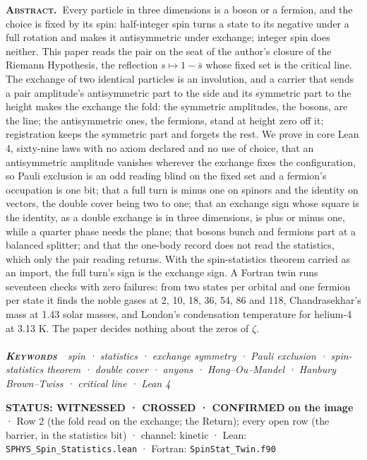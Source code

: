 \documentclass[10pt]{article}
\renewenvironment{quote}{\par\smallskip\noindent\small\color{deep}}{\par\smallskip}
\begin{document}
{\small\noindent\textbf{\scshape\color{deep}Abstract.\ }Every particle
in three dimensions is a boson or a fermion, and the choice is fixed by
its spin: half-integer spin turns a state to its negative under a full
rotation and makes it antisymmetric under exchange; integer spin does
neither. This paper reads the pair on the seat of the author's closure
of the Riemann Hypothesis, the reflection \(s\mapsto1-\bar s\) whose
fixed set is the critical line. The exchange of two identical particles
is an involution, and a carrier that sends a pair amplitude's
antisymmetric part to the side and its symmetric part to the height
makes the exchange the fold: the symmetric amplitudes, the bosons, are
the line; the antisymmetric ones, the fermions, stand at height zero off
it; registration keeps the symmetric part and forgets the rest. We prove
in core Lean 4, sixty-nine laws with no axiom declared and no use of
choice, that an antisymmetric amplitude vanishes wherever the exchange
fixes the configuration, so Pauli exclusion is an odd reading blind on
the fixed set and a fermion's occupation is one bit; that a full turn is
minus one on spinors and the identity on vectors, the double cover being
two to one; that an exchange sign whose square is the identity, as a
double exchange is in three dimensions, is plus or minus one, while a
quarter phase needs the plane; that bosons bunch and fermions part at a
balanced splitter; and that the one-body record does not read the
statistics, which only the pair reading returns. With the
spin-statistics theorem carried as an import, the full turn's sign is
the exchange sign. A Fortran twin runs seventeen checks with zero
failures: from two states per orbital and one fermion per state it finds
the noble gases at 2, 10, 18, 36, 54, 86 and 118, Chandrasekhar's mass
at 1.43 solar masses, and London's condensation temperature for helium-4
at 3.13 K. The paper decides nothing about the zeros of
\(\zeta\).}\\[-2pt]
\noindent{\color{accent}\rule{\textwidth}{0.6pt}}\\[1pt]
{\itshape\footnotesize\color{faint}\noindent\textbf{\upshape\scshape\color{deep}Keywords\ }\ spin
· statistics · exchange symmetry · Pauli exclusion · spin-statistics
theorem · double cover · anyons · Hong--Ou--Mandel · Hanbury
Brown--Twiss · critical line · Lean 4}\par\vspace{8pt}
\thispagestyle{fancy}
\begin{quote}
\textbf{STATUS: WITNESSED · CROSSED · CONFIRMED on the image} · Row 2
(the fold read on the exchange; the Return); every open row (the
barrier, in the statistics bit) · channel: kinetic · Lean:
\texttt{SPHYS\_Spin\_Statistics.lean} · Fortran:
\texttt{SpinStat\_Twin.f90}
\end{quote}
\end{document}
